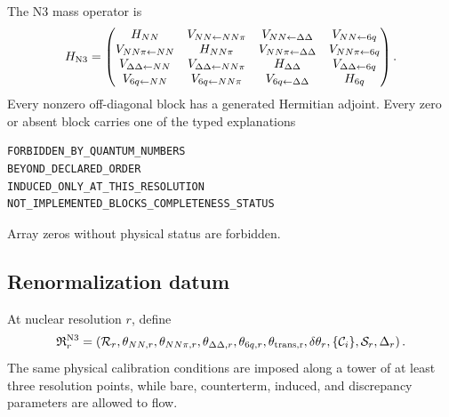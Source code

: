 \documentclass[11pt]{article}
\newcommand{\cR}{\mathcal R}
\newcommand{\cS}{\mathcal S}
\newcommand{\cC}{\mathcal C}
\begin{document}
The N3 mass operator is
\begin{equation}
 H_{\rm N3}
 =\begin{pmatrix}
 H_{NN} & V_{NN\leftarrow NN\pi} & V_{NN\leftarrow\Delta\Delta} & V_{NN\leftarrow6q}\\
 V_{NN\pi\leftarrow NN} & H_{NN\pi} & V_{NN\pi\leftarrow\Delta\Delta} & V_{NN\pi\leftarrow6q}\\
 V_{\Delta\Delta\leftarrow NN} & V_{\Delta\Delta\leftarrow NN\pi} & H_{\Delta\Delta} & V_{\Delta\Delta\leftarrow6q}\\
 V_{6q\leftarrow NN} & V_{6q\leftarrow NN\pi} & V_{6q\leftarrow\Delta\Delta} & H_{6q}
 \end{pmatrix}.
\label{eq:n3-hamiltonian}
\end{equation}
Every nonzero off-diagonal block has a generated Hermitian adjoint.  Every zero or absent block carries one of the typed explanations
\begin{verbatim}
FORBIDDEN_BY_QUANTUM_NUMBERS
BEYOND_DECLARED_ORDER
INDUCED_ONLY_AT_THIS_RESOLUTION
NOT_IMPLEMENTED_BLOCKS_COMPLETENESS_STATUS
\end{verbatim}
Array zeros without physical status are forbidden.

\subsection{Renormalization datum}

At nuclear resolution \(r\), define
\begin{equation}
 \mathfrak R_{r}^{\rm N3}
 =\left(
 \cR_r,
 \theta_{NN,r},
 \theta_{NN\pi,r},
 \theta_{\Delta\Delta,r},
 \theta_{6q,r},
 \theta_{\rm trans,r},
 \delta\theta_{r},
 \{\cC_i\},
 \cS_r,
 \Delta_r
 \right).
\label{eq:n3-renormalization}
\end{equation}
The same physical calibration conditions are imposed along a tower of at least three resolution points, while bare, counterterm, induced, and discrepancy parameters are allowed to flow.
\end{document}

